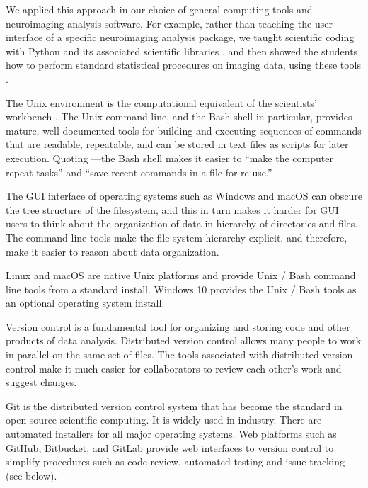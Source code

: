 We applied this approach in our choice of general computing tools and
neuroimaging analysis software.   For example, rather than teaching the user
interface of a specific neuroimaging analysis package, we taught scientific
coding with Python and its associated scientific libraries
\citep{millman2011python, perez2011python}, and then showed the students how to
perform standard statistical procedures on imaging data, using these tools
\citep{millman2007analysis}.


The Unix environment is the computational equivalent of the scientists'
workbench \citep{preeyanon2014reproducible}.  The Unix command line, and the
Bash shell in particular, provides mature, well-documented tools for building
and executing sequences of commands that are readable, repeatable, and can be
stored in text files as scripts for later execution.  Quoting
\cite{wilson2014best}---the Bash shell makes it easier to ``make the computer
repeat tasks'' and ``save recent commands in a file for re-use.''

The GUI interface of operating systems such as Windows and macOS can obscure
the tree structure of the filesystem, and this in turn makes it harder for GUI
users to think about the organization of data in hierarchy of directories and
files.  The command line tools make the file system hierarchy explicit, and
therefore, make it easier to reason about data organization.

Linux and macOS are native Unix platforms and provide Unix / Bash command line
tools from a standard install.  Windows 10 provides the Unix / Bash tools as
an optional operating system install.

Version control is a fundamental tool for organizing and storing code and
other products of data analysis.
Distributed version control allows many people to work in parallel on the
same set of files.
The tools associated with distributed version control make it much easier
for collaborators to review each other's work and suggest changes.

Git is the distributed version control system that has become the standard in
open source scientific computing. It is widely used in industry.
There are automated installers for all major operating systems.
Web platforms such as GitHub, Bitbucket, and GitLab provide web interfaces
to version control to simplify procedures such as code review, automated
testing and issue tracking (see below).

